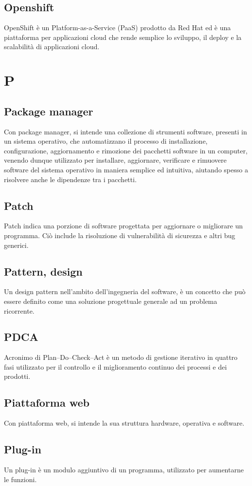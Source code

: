 \subsection{Openshift}  OpenShift è un Platform-as-a-Service (PaaS) prodotto da Red Hat ed è una piattaforma per applicazioni cloud che rende semplice lo sviluppo, il deploy e la scalabilità di applicazioni cloud. 


\newpage \section{P}
\subsection{Package manager}  Con package manager, si intende una collezione di strumenti software, presenti in un sistema operativo, che automatizzano il processo di installazione, configurazione, aggiornamento e rimozione dei pacchetti software in un computer, venendo dunque utilizzato per installare, aggiornare, verificare e rimuovere software del sistema operativo in maniera semplice ed intuitiva, aiutando spesso a risolvere anche le dipendenze tra i pacchetti.
\subsection{Patch}  Patch indica una porzione di software progettata per aggiornare o migliorare un programma. Ciò include la risoluzione di vulnerabilità di sicurezza e altri bug generici.
\subsection{Pattern, design}  Un design pattern nell'ambito dell'ingegneria del software, è un concetto che può essere definito come una soluzione progettuale generale ad un problema ricorrente.
\subsection{PDCA}  Acronimo di Plan–Do–Check–Act è un metodo di gestione iterativo in quattro fasi utilizzato per il controllo e il miglioramento continuo dei processi e dei prodotti.
\subsection{Piattaforma web}  Con piattaforma web, si intende la sua struttura hardware, operativa e software.
\subsection{Plug-in}  Un plug-in è un modulo aggiuntivo di un programma, utilizzato per aumentarne le funzioni.
